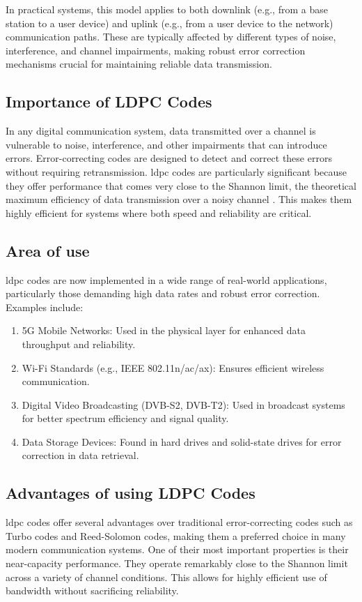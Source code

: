 \documentclass[../main.tex]{subfiles}
\begin{document}
In practical systems, this model applies to both downlink (e.g., from a base station to a user device) and uplink (e.g., from a user device to the network) communication paths.
These are typically affected by different types of noise, interference, and channel impairments, making robust error correction mechanisms crucial for maintaining reliable data transmission.

\subsection{Importance of LDPC Codes}
In any digital communication system, data transmitted over a channel is vulnerable to noise, interference, and other impairments that can introduce errors. 
Error-correcting codes are designed to detect and correct these errors without requiring retransmission. 
\gls{ldpc} codes are particularly significant because they offer performance that comes very close to the Shannon limit, the theoretical maximum efficiency of data transmission over a noisy channel \cite{shannon1948}. 
This makes them highly efficient for systems where both speed and reliability are critical.

\subsection{Area of use} %
\gls{ldpc} codes are now implemented in a wide range of real-world applications, particularly those demanding high data rates and robust error correction. Examples include:
\begin{enumerate}
    \item 5G Mobile Networks: Used in the physical layer for enhanced data throughput and reliability.
    \item Wi-Fi Standards (e.g., IEEE 802.11n/ac/ax): Ensures efficient wireless communication.
    \item Digital Video Broadcasting (DVB-S2, DVB-T2): Used in broadcast systems for better spectrum efficiency and signal quality.
    \item Data Storage Devices: Found in hard drives and solid-state drives for error correction in data retrieval.
\end{enumerate}

\subsection{Advantages of using LDPC Codes}
\gls{ldpc} codes offer several advantages over traditional error-correcting codes such as Turbo codes and Reed-Solomon codes, making them a preferred choice in many modern communication systems. 
One of their most important properties is their near-capacity performance. They operate remarkably close to the Shannon limit across a variety of channel conditions. 
This allows for highly efficient use of bandwidth without sacrificing reliability.
\end{document}
